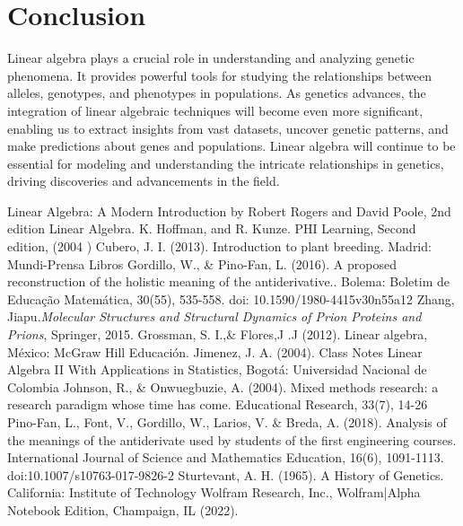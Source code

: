\documentclass[a4paper,12pt]{article}
\begin{document}
\section{Conclusion}
Linear algebra plays a crucial role in understanding and analyzing genetic phenomena. It provides powerful tools for studying the relationships between alleles, genotypes, and phenotypes in populations. As genetics advances, the integration of linear algebraic techniques will become even more significant, enabling us to extract insights from vast datasets, uncover genetic patterns, and make predictions about genes and populations. Linear algebra will continue to be essential for modeling and understanding the intricate relationships in genetics, driving discoveries and advancements in the field.
\newpage
\begin{thebibliography}{1}
 Linear Algebra: A Modern Introduction by Robert Rogers and David Poole, 2nd edition
 Linear Algebra. K. Hoffman, and R. Kunze. PHI Learning, Second edition, (2004 )
 Cubero, J. I. (2013). Introduction to plant breeding. Madrid: Mundi-Prensa Libros
 Gordillo, W., \& Pino-Fan, L. (2016). A proposed reconstruction of the holistic meaning of the antiderivative.. Bolema: Boletim de Educação Matemática, 30(55), 535-558. doi: 10.1590/1980-4415v30n55a12
 Zhang, Jiapu.\textit{Molecular Structures and Structural Dynamics of Prion Proteins and Prions}, Springer, 2015.
 Grossman, S. I.,\& Flores,J .J (2012). Linear algebra, México: McGraw Hill Educación.
 Jimenez, J. A. (2004). Class Notes Linear Algebra II With Applications in Statistics, Bogotá: Universidad Nacional de Colombia
 Johnson, R., \& Onwuegbuzie, A. (2004). Mixed methods research: a research paradigm whose time has come. Educational Research, 33(7), 14-26
 Pino-Fan, L., Font, V., Gordillo, W., Larios, V. \& Breda, A. (2018). Analysis of the meanings of the antiderivate used by students of the first engineering courses. International Journal of Science and Mathematics Education, 16(6), 1091-1113. doi:10.1007/s10763-017-9826-2
 Sturtevant, A. H. (1965). A History of Genetics. California: Institute of Technology
 Wolfram Research, Inc., Wolfram|Alpha Notebook Edition, Champaign, IL (2022).
\end{thebibliography}
\end{document}

